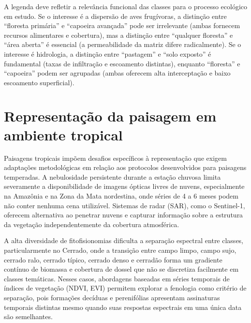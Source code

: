 \documentclass[
  portuguese,
  11pt,
  a4paper,
  open=any]{scrbook}
\begin{document}
\begin{tcolorbox}[enhanced jigsaw, colbacktitle=quarto-callout-note-color!10!white, coltitle=black, opacityback=0, breakable, left=2mm, colback=white, bottomtitle=1mm, toptitle=1mm, titlerule=0mm, arc=.35mm, opacitybacktitle=0.6, leftrule=.75mm, colframe=quarto-callout-note-color-frame, title=\textcolor{quarto-callout-note-color}{\faInfo}\hspace{0.5em}{Classificação e processo ecológico}, rightrule=.15mm, bottomrule=.15mm, toprule=.15mm]

A legenda deve refletir a relevância funcional das classes para o
processo ecológico em estudo. Se o interesse é a dispersão de aves
frugívoras, a distinção entre ``floresta primária'' e ``capoeira
avançada'' pode ser irrelevante (ambas fornecem recursos alimentares e
cobertura), mas a distinção entre ``qualquer floresta'' e ``área
aberta'' é essencial (a permeabilidade da matriz difere radicalmente).
Se o interesse é hidrologia, a distinção entre ``pastagem'' e ``solo
exposto'' é fundamental (taxas de infiltração e escoamento distintas),
enquanto ``floresta'' e ``capoeira'' podem ser agrupadas (ambas oferecem
alta interceptação e baixo escoamento superficial).

\end{tcolorbox}

\section{Representação da paisagem em ambiente
tropical}\label{representauxe7uxe3o-da-paisagem-em-ambiente-tropical}

Paisagens tropicais impõem desafios específicos à representação que
exigem adaptações metodológicas em relação aos protocolos desenvolvidos
para paisagens temperadas. A nebulosidade persistente durante a estação
chuvosa limita severamente a disponibilidade de imagens ópticas livres
de nuvens, especialmente na Amazônia e na Zona da Mata nordestina, onde
séries de 4 a 6 meses podem não conter nenhuma cena utilizável. Sistemas
de radar (SAR), como o Sentinel-1, oferecem alternativa ao penetrar
nuvens e capturar informação sobre a estrutura da vegetação
independentemente da cobertura atmosférica.

A alta diversidade de fitofisionomias dificulta a separação espectral
entre classes, particularmente no Cerrado, onde a transição entre campo
limpo, campo sujo, cerrado ralo, cerrado típico, cerrado denso e
cerradão forma um gradiente contínuo de biomassa e cobertura de dossel
que não se discretiza facilmente em classes temáticas. Nesses casos,
abordagens baseadas em séries temporais de índices de vegetação (NDVI,
EVI) permitem explorar a fenologia como critério de separação, pois
formações decíduas e perenifólias apresentam assinaturas temporais
distintas mesmo quando suas respostas espectrais em uma única data são
semelhantes.
\end{document}
